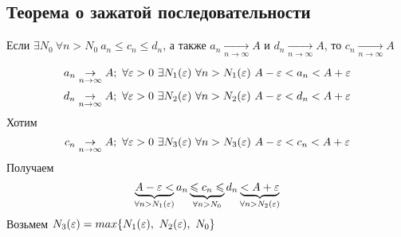 \subsection{Теорема о зажатой последовательности}
\begin{theorem}
    Если $\exists N_0\ \forall n > N_0\ a_n \leq c_n \leq d_n$, а также $a_n \underset{n \to \infty}{\to} A$ и $d_n \underset{n \to \infty}{\to} A$, то $c_n \underset{n \to \infty}{\to} A$
\end{theorem}

\begin{Proof}
    $$a_n \underset{n \to \infty}{\to} A;\ \forall \eps > 0\ \exists N_1(\eps)\ \forall n > N_1(\eps)\ A-\eps < a_n < A+\eps$$
    $$d_n \underset{n \to \infty}{\to} A;\ \forall \eps > 0\ \exists N_2(\eps)\ \forall n > N_2(\eps)\ A-\eps < d_n < A+\eps$$
    Хотим
    $$c_n \underset{n \to \infty}{\to} A;\ \forall \eps > 0\ \exists N_3(\eps)\ \forall n > N_3(\eps)\ A-\eps < c_n < A+\eps$$
    Получаем
    $$ \underbrace{A-\varepsilon <}_{\forall n > N_1(\varepsilon)} a_n \underbrace{\leqslant c_n \leqslant}_{\forall n > N_0} d_n \underbrace{< A+\varepsilon}_{\forall n > N_2(\varepsilon)} $$
    Возьмем $N_3(\eps) = max\{N_1(\eps),\ N_2(\eps),\ N_0\}$
\end{Proof}
